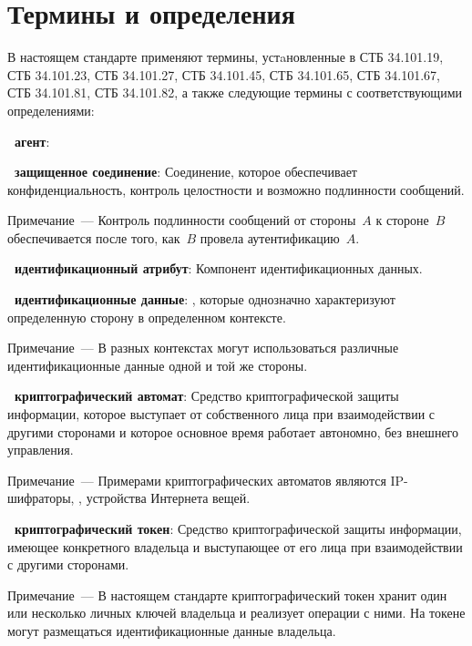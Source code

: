 \chapter{Термины и определения}

В настоящем стандарте применяют термины, устaновленные в СТБ 34.101.19,
СТБ 34.101.23, СТБ 34.101.27, СТБ 34.101.45, СТБ 34.101.65, 
СТБ 34.101.67, СТБ 34.101.81, СТБ 34.101.82, а также следующие термины с 
соответствующими определениями:

{\bf \thedefctr~агент}:

{\bf \thedefctr~защищенное соединение}:
Соединение, которое обеспечивает конфиденциальность, 
контроль целостности и возможно подлинности сообщений. 

\begin{note}
Примечание~--- Контроль подлинности сообщений от стороны~$A$ к стороне~$B$ 
обеспечивается после того, как~$B$ провела аутентификацию~$A$.
\end{note}

{\bf \thedefctr~идентификационный атрибут}:
Компонент идентификационных данных. 

{\bf \thedefctr~идентификационные данные}:
, которые однозначно характеризуют определенную 
сторону в определенном контексте. 

\begin{note}
Примечание~--- В разных контекстах могут использоваться 
различные идентификационные данные одной и той же стороны.
\end{note}

{\bf\thedefctr~криптографический автомат}: 
Средство криптографической защиты информации, которое выступает от 
собственного лица при взаимодействии с другими сторонами
и которое основное время работает автономно, без внешнего управления.

\begin{note}
Примечание~--- 
Примерами криптографических автоматов являются IP-шифраторы, 
, устройства Интернета вещей.
\end{note}

{\bf\thedefctr~криптографический токен}: 
Средство криптографической защиты информации, имеющее конкретного 
владельца и выступающее от его лица при взаимодействии с другими 
сторонами. 
%
\begin{note}
Примечание~--- В настоящем стандарте криптографический токен хранит один 
или несколько личных ключей владельца и реализует операции с ними.  
%
На токене могут размещаться идентификационные данные владельца. 
\end{note}

